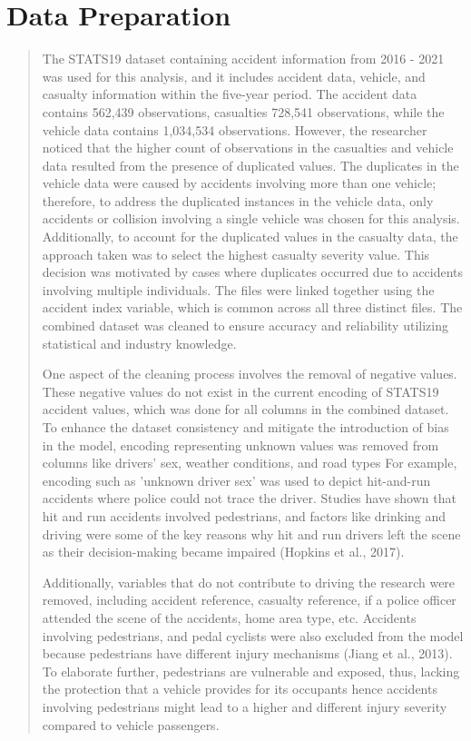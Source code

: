 \documentclass[12]{report}
\begin{document}
\section{Data Preparation}
\begin{quote}
{\large
The STATS19 dataset containing accident information from 2016 - 2021 was used for this analysis, and it includes accident data, vehicle, and casualty information within the five-year period. The accident data contains 562,439 observations, casualties 728,541 observations, while the vehicle data contains 1,034,534 observations. However, the researcher noticed that the higher count of observations in the casualties and vehicle data resulted from the presence of duplicated values.
The duplicates in the vehicle data were caused by accidents involving more than one vehicle; therefore, to address the duplicated instances in the vehicle data, only accidents or collision involving a single vehicle was chosen for this analysis. Additionally, to account for the duplicated values in the casualty data, the approach taken was to select the highest casualty severity value. This decision was motivated by cases where duplicates occurred due to accidents involving multiple individuals. The files were linked together using the accident index variable, which is common across all three distinct files. The combined dataset was cleaned to ensure accuracy and reliability utilizing statistical and industry knowledge.

One aspect of the cleaning process involves the removal of negative values. These negative values do not exist in the current encoding of STATS19 accident values, which was done for all columns in the combined dataset. To enhance the dataset consistency and mitigate the introduction of bias in the model, encoding representing unknown values was removed from  columns like drivers' sex, weather conditions, and road types For example, encoding such as 'unknown driver sex' was used to depict hit-and-run accidents where police could not trace the driver. Studies have shown that hit and run accidents involved pedestrians, and factors like drinking and driving were some of the key reasons why hit and run drivers left the scene as their decision-making became impaired (Hopkins et al., 2017).

Additionally, variables that do not contribute to driving the research were removed, including accident reference, casualty reference, if a police officer attended the scene of the accidents, home area type, etc. Accidents involving pedestrians, and pedal cyclists were also excluded from the model because pedestrians have different injury mechanisms (Jiang et al., 2013). To elaborate further, pedestrians are vulnerable and exposed, thus, lacking the protection that a vehicle provides for its occupants hence accidents involving pedestrians might lead to a higher and different injury severity compared to vehicle passengers.

}
\end{quote}
\end{document}
